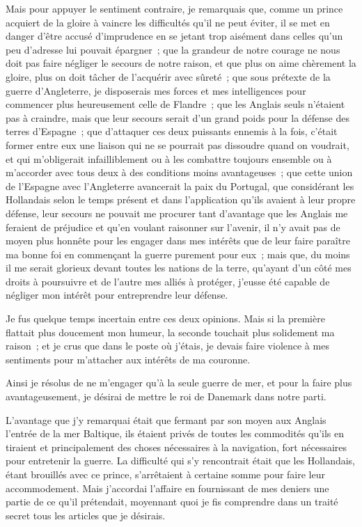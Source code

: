 \documentclass[french,twoside]{book} %
\begin{document}
Mais pour appuyer le sentiment contraire, je remarquais que, comme un prince acquiert de la gloire à vaincre les difficultés qu’il ne peut éviter, il se met en danger d’être accusé d’imprudence en se jetant trop aisément dans celles qu’un peu d’adresse lui pouvait épargner ; que la grandeur de notre courage ne nous doit pas faire négliger le secours de notre raison, et que plus on aime chèrement la gloire, plus on doit tâcher de l’acquérir avec sûreté ; que sous prétexte de la guerre d’Angleterre, je disposerais mes forces et mes intelligences pour commencer plus heureusement celle de Flandre ; que les Anglais seuls n’étaient pas à craindre, mais que leur secours serait d’un grand poids pour la défense des terres d’Espagne ; que d’attaquer ces deux puissants ennemis à la fois, c’était former entre eux une liaison qui ne se pourrait pas dissoudre quand on voudrait, et qui m’obligerait infailliblement ou à les combattre toujours ensemble ou à m’accorder avec tous deux à des conditions moins avantageuses ; que cette union de l’Espagne avec l’Angleterre avancerait la paix du Portugal, que considérant les Hollandais selon le temps présent et dans l’application qu’ils avaient à leur propre défense, leur secours ne pouvait me procurer tant d’avantage que les Anglais me feraient de préjudice et qu’en voulant raisonner sur l’avenir, il n’y avait pas de moyen plus honnête pour les engager dans mes intérêts que de leur faire paraître ma bonne foi en commençant la guerre purement pour eux ; mais que, du moins il me serait glorieux devant toutes les nations de la terre, qu’ayant d’un côté mes droits à poursuivre et de l’autre mes alliés à protéger, j’eusse été capable de négliger mon intérêt pour entreprendre leur défense.\par
Je fus quelque temps incertain entre ces deux opinions. Mais si la première flattait plus doucement mon humeur, la seconde touchait plus solidement ma raison ; et je crus que dans le poste où j’étais, je devais faire violence à mes sentiments pour m’attacher aux intérêts de ma couronne.\par
Ainsi je résolus de ne m’engager qu’à la seule guerre de mer, et pour la faire plus avantageusement, je désirai de mettre le roi de Danemark dans notre parti.\par
L’avantage que j’y remarquai était que fermant par son moyen aux Anglais l’entrée de la mer Baltique, ils étaient privés de toutes les commodités qu’ils en tiraient et principalement des choses nécessaires à la navigation, fort nécessaires pour entretenir la guerre. La difficulté qui s’y rencontrait était que les Hollandais, étant brouillés avec ce prince, s’arrêtaient à certaine somme pour faire leur accommodement. Mais j’accordai l’affaire en fournissant de mes deniers une partie de ce qu’il prétendait, moyennant quoi je fis comprendre dans un traité secret tous les articles que je désirais.\par
\end{document}
